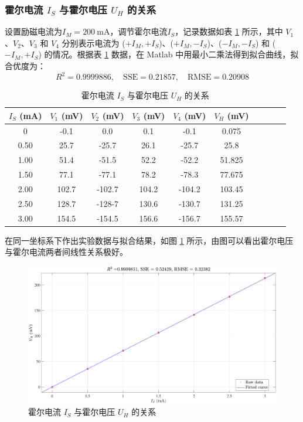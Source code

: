 \documentclass[UTF8]{article}
\theoremstyle{MyLineTheoremStyle} %
\theoremstyle{MyBlockTheoremStyle} %
\theoremstyle{MySubsubsectionStyle} %
\begin{document}
\subsubsection{霍尔电流 $ I_S $ 与霍尔电压 $ U_H $ 的关系}
设置励磁电流为$ I_M= 200 \ \mathrm{mA} $，调节霍尔电流$ I_S $，记录数据如表 \ref{霍尔电流与霍尔电压的关系} 所示，其中 $V_1$、$V_2$、$V_3$ 和 $V_4$ 分别表示电流为 ($+I_M, +I_S$)、($+I_M, -I_S$)、($-I_M, -I_S$) 和 ($-I_M, +I_S$) 的情况。根据表 \ref{霍尔电流与霍尔电压的关系} 数据，在 Matlab 中用最小二乘法得到拟合曲线，拟合优度为：
\begin{equation}
R^2 = 0.9999886,\quad \text{SSE} = 0.21857,\quad  \text{RMSE} = 0.20908
\end{equation}
\begin{table}[H]\centering
    \caption{霍尔电流 $I_S$ 与霍尔电压 $U_H$ 的关系}
    \label{霍尔电流与霍尔电压的关系}
\begin{tabular}{cccccccccc}\toprule
    $I_S$ (mA) & $V_1$ (mV)  & $V_2$ (mV)  & $V_3$ (mV)   & $V_4$ (mV)   & $V_H$ (mV)    \\
    \midrule
    0	    &-0.1	&0.0	&0.1	&-0.1	    & 0.075 \\ 
    0.50	&25.7	&-25.7	&26.1	&-25.7	    &  25.8 \\ 
    1.00	&51.4	&-51.5	&52.2	&-52.2	    &51.825 \\ 
    1.50	&77.1	&-77.1	&78.2	&-78.3	    &77.675 \\ 
    2.00	&102.7	&-102.7	&104.2	&-104.2	    &103.45 \\ 
    2.50	&128.7	&-128-7	&130.6	&-130.7	    &131.25 \\ 
    3.00	&154.5	&-154.5	&156.6	&-156.7	    &155.57 \\ 
    \bottomrule
\end{tabular}
\end{table}
在同一坐标系下作出实验数据与拟合结果，如图 \ref{霍尔电流与霍尔电压的关系 图} 所示，由图可以看出霍尔电压与霍尔电流两者间线性关系极好。
\begin{figure}[H]\centering
    \includegraphics[width=0.9\columnwidth]{assets/1/1.pdf}
    \caption{霍尔电流 $I_S$ 与霍尔电压 $U_H$ 的关系}
    \label{霍尔电流与霍尔电压的关系 图}
\end{figure}
\end{document}
